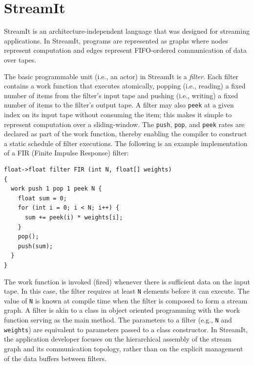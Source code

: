 \section{StreamIt}
\label{sec:streamit}

StreamIt  is   an  architecture-independent  language that was
designed for  streaming applications. In StreamIt, programs are
represented as graphs where  nodes represent  computation and edges
represent FIFO-ordered communication of data over tapes.

The  basic programmable  unit (i.e., an actor) in  StreamIt is a {\it
filter}.   Each filter contains  a work  function that executes
atomically,  popping (i.e., reading)  a fixed number  of items  from
the  filter's input  tape and pushing (i.e., writing) a fixed number
of items to the filter's output tape.  A filter  may also {\tt peek} at
a given index  on its input tape without  consuming  the  item;  this
makes  it  simple  to  represent computation over a
sliding-window.   The {\tt push}, {\tt pop}, and {\tt peek} rates are
declared as part  of  the work  function,  thereby enabling  the
compiler    to construct a static schedule of filter executions. The
following is an example implementation of a FIR   (Finite Impulse
Response)  filter: 
\begin{verbatim}
float->float filter FIR (int N, float[] weights) 
{
  work push 1 pop 1 peek N {
    float sum = 0;
    for (int i = 0; i < N; i++) {
      sum += peek(i) * weights[i];
    }
    pop();
    push(sum);
  }
}
\end{verbatim}

The work function is invoked (fired) whenever there is sufficient data
on the input tape. In this case, the filter requires at least
\texttt{N} elements before it can execute. The value of \texttt{N} is
known at compile time when the filter is composed to form a stream
graph. A filter is akin to a class in object oriented programming
with the work function serving as the main method. The parameters
to a filter (e.g., \texttt{N} and \texttt{weights}) are equivalent to
parameters passed to a class constructor. In StreamIt, the
application developer focuses on the hierarchical assembly of the
stream graph and its communication topology, rather than on the 
explicit management of the data buffers between filters.

